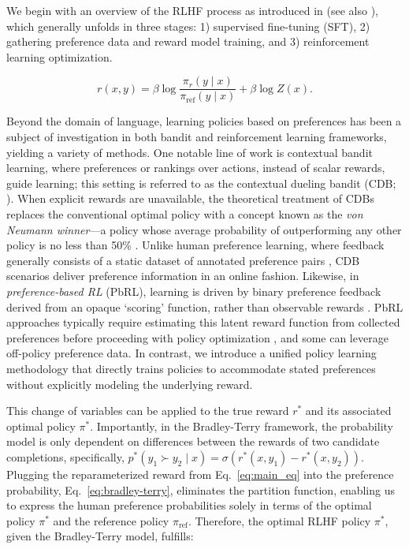 We begin with an overview of the RLHF process as introduced in \citeauthor{ziegler2020finetuning} (see also \citep{stiennon2022learning, bai2022training, ouyang2022training}), which generally unfolds in three stages: 1) supervised fine-tuning (SFT), 2) gathering preference data and reward model training, and 3) reinforcement learning optimization.

\begin{equation}\label{eq:main_eq}
    r(x,y) =\beta \log \frac{\pi_r(y\mid x)}{\pi_\text{ref}(y\mid x)} + \beta \log Z(x).
\end{equation}

Beyond the domain of language, learning policies based on preferences has been a subject of investigation in both bandit and reinforcement learning frameworks, yielding a variety of methods. One notable line of work is contextual bandit learning, where preferences or rankings over actions, instead of scalar rewards, guide learning; this setting is referred to as the contextual dueling bandit (CDB; \cite{yue2012karmed,dudik2015contextual}). When explicit rewards are unavailable, the theoretical treatment of CDBs replaces the conventional optimal policy with a concept known as the \textit{von Neumann winner}—a policy whose average probability of outperforming any other policy is no less than 50\% \citep{dudik2015contextual}. Unlike human preference learning, where feedback generally consists of a static dataset of annotated preference pairs \citep{yan2022human}, CDB scenarios deliver preference information in an online fashion. Likewise, in \textit{preference-based RL} (PbRL), learning is driven by binary preference feedback derived from an opaque ‘scoring’ function, rather than observable rewards \citep{BusaFekete2014,ruiz2023dueling}. PbRL approaches typically require estimating this latent reward function from collected preferences before proceeding with policy optimization \citep{jain2013learning,BusaFekete2014,christiano2017deep,sadigh2017active,kupcsik2018learning}, and some can leverage off-policy preference data. In contrast, we introduce a unified policy learning methodology that directly trains policies to accommodate stated preferences without explicitly modeling the underlying reward.

This change of variables can be applied to the true reward $r^*$ and its associated optimal policy $\pi^*$. Importantly, in the Bradley-Terry framework, the probability model is only dependent on differences between the rewards of two candidate completions, specifically, ${p^*(y_1 \succ y_2 \mid x) = \sigma(r^*(x, y_1) - r^*(x, y_2))}$. Plugging the reparameterized reward from Eq.~\ref{eq:main_eq} into the preference probability, Eq.~\ref{eq:bradley-terry}, eliminates the partition function, enabling us to express the human preference probabilities solely in terms of the optimal policy $\pi^*$ and the reference policy $\pi_\text{ref}$. Therefore, the optimal RLHF policy $\pi^*$, given the Bradley-Terry model, fulfills:

